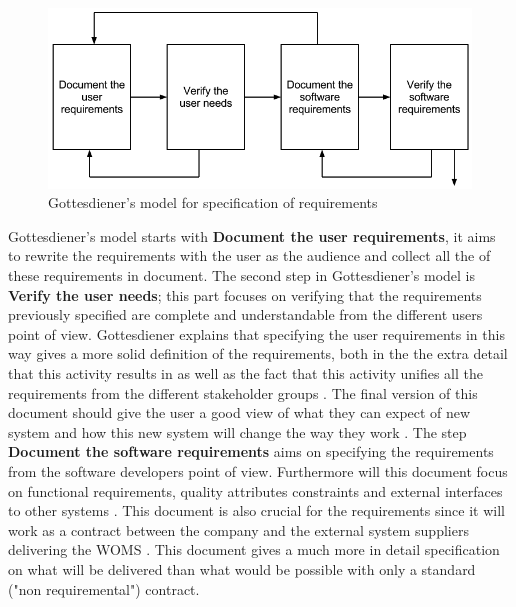 \documentclass[a4paper]{article}
\begin{document}
\begin{figure}[H]
	\centering
		\includegraphics[width=1\textwidth]{images/specifications_model.png}
	\caption{Gottesdiener's model for specification of requirements \cite{gott5}}
	\label{figure:specifications}
\end{figure}

Gottesdiener's model starts with \textbf{Document the user requirements}, it aims to rewrite the requirements with the user as the audience and collect all the of these requirements in document. The second step in Gottesdiener's model is \textbf{Verify the user needs}; this part focuses on verifying that the requirements previously specified are complete and understandable from the different users point of view. Gottesdiener explains that specifying the user requirements in this way gives a more solid definition of the requirements, both in the the extra detail that this activity results in as well as the fact that this activity unifies all the requirements from the different stakeholder groups \cite{gott5}. The final version of this document should give the user a good view of what they can expect of new system and how this new system will change the way they work \cite{gott5}. The step \textbf{Document the software requirements} aims on specifying the requirements from the software developers point of view. Furthermore will this document focus on functional requirements, quality attributes constraints and external interfaces to other systems \cite{gott5}. This document is also crucial for the requirements since it will work as a contract between the company and the external system suppliers delivering the WOMS \cite{gott5}. This document gives a much more in detail specification on what will be delivered than what would be possible with only a standard ("non requiremental") contract. 
\end{document}
